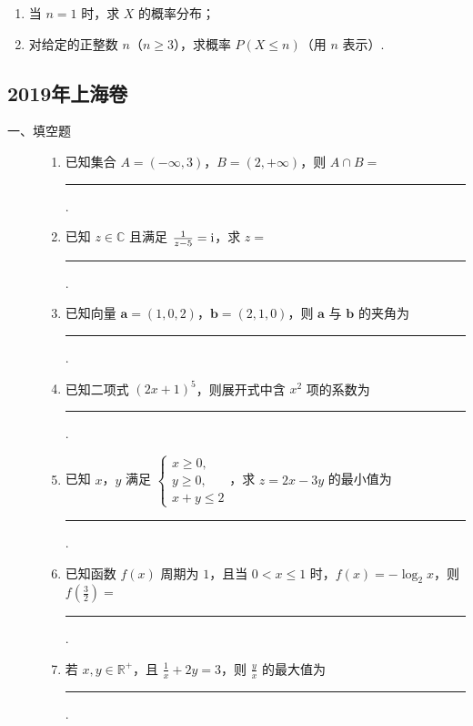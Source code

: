 \begin{description}
\begin{enumerate}[leftmargin=5pt]
\begin{enumerate}
\item 当 \(n=1\) 时，求 \(X\) 的概率分布；
\item 对给定的正整数 \(n\)（\(n\ge 3\)），求概率 \(P(X\le n)\)（用 \(n\) 表示）.
\end{enumerate}

    \end{enumerate}

\end{description}


\subsection{2019年上海卷}\label{gk:2019年上海卷}

\begin{description}

    \item[一、填空题]

    \begin{enumerate}[leftmargin=5pt]

        \item 已知集合 \(A=(-\infty,3)\)，\(B=(2,+\infty)\)，则 \(A\cap B=\)\rule[-0.3ex]{3em}{0.4pt}.

        \item 已知 \(z\in\mathbb{C}\) 且满足 \(\frac1{z-5}=\mathrm{i}\)，求 \(z=\)\rule[-0.3ex]{3em}{0.4pt}.

        \item 已知向量 \(\bm{a}=(1,0,2)\)，\(\bm{b}=(2,1,0)\)，则 \(\bm{a}\) 与 \(\bm{b}\) 的夹角为\rule[-0.3ex]{3em}{0.4pt}.

        \item 已知二项式 \((2x+1)^5\)，则展开式中含 \(x^2\) 项的系数为\rule[-0.3ex]{3em}{0.4pt}.

        \item 已知 \(x\)，\(y\) 满足
\(
\begin{cases}
x\ge0,\\
y\ge0,\\
x+y\le2
\end{cases}
\)，求 \(z=2x-3y\) 的最小值为\rule[-0.3ex]{3em}{0.4pt}.

        \item 已知函数 \(f(x)\) 周期为 \(1\)，且当 \(0<x\le1\) 时，\(f(x)=-\log_2x\)，则 \(f\left(\frac32\right)=\)\rule[-0.3ex]{3em}{0.4pt}.

        \item 若 \(x,y\in\mathbb{R}^+\)，且 \(\frac1x+2y=3\)，则 \(\frac yx\) 的最大值为\rule[-0.3ex]{3em}{0.4pt}.


\end{enumerate}
\end{description}
